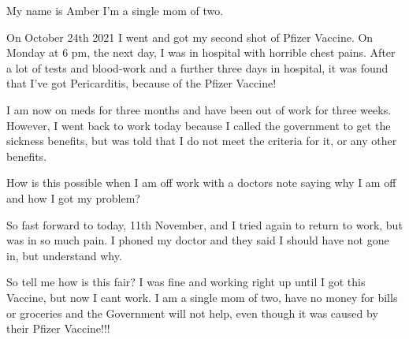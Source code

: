 My name is Amber I’m a single mom of two.

On October 24th 2021 I went and got my second shot of Pfizer Vaccine. On Monday
at 6 pm, the next day, I was in hospital with horrible chest pains. After a lot
of tests and blood-work and a further three days in hospital, it was found that
I’ve got Pericarditis, because of the Pfizer Vaccine!

I am now on meds for three months and have been out of work for three
weeks. However, I went back to work today because I called the government to get
the sickness benefits, but was told that I do not meet the criteria for it, or
any other benefits.

How is this possible when I am off work with a doctors note saying why I am off
and how I got my problem?

So fast forward to today, 11th November, and I tried again to return to work,
but was in so much pain. I phoned my doctor and they said I should have not gone
in, but understand why.

So tell me how is this fair? I was fine and working right up until I got this
Vaccine, but now I cant work. I am a single mom of two, have no money for bills
or groceries and the Government will not help, even though it was caused by
their Pfizer Vaccine!!!
